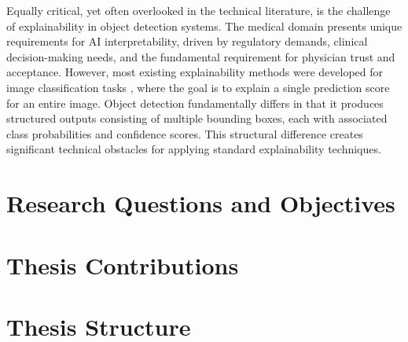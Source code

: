 Equally critical, yet often overlooked in the technical literature, is the challenge of explainability in object detection systems. The medical domain presents unique requirements for AI interpretability, driven by regulatory demands, clinical decision-making needs, and the fundamental requirement for physician trust and acceptance. However, most existing explainability methods were developed for image classification tasks \cite{selvaraju2019gradcam,chattopadhay_2018gradcam++,draelos2021hirescam,jiang2021layercam}, where the goal is to explain a single prediction score for an entire image. Object detection fundamentally differs in that it produces structured outputs consisting of multiple bounding boxes, each with associated class probabilities and confidence scores.
This structural difference creates significant technical obstacles for applying standard explainability techniques.

\section{Research Questions and Objectives}

\section{Thesis Contributions}

\section{Thesis Structure}